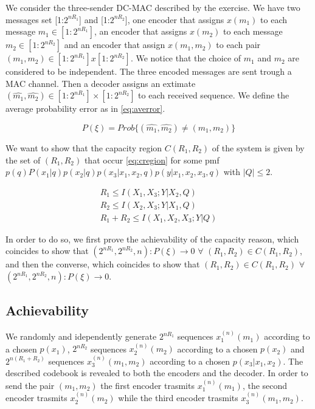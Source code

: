
We consider the three-sender DC-MAC described by the exercise. We have two messages set [1:$2^{nR_1}$] and [1:$2^{nR_2}$], one encoder that assigns $x(m_1)$ to each message $m_1 \in [1:2^{nR_1}]$, an encoder that assigns $x(m_2)$ to each message $m_2 \in [1:2^{nR_2}]$ and an encoder that assign $x(m_1,m_2)$ to each pair $(m_1,m_2) \in [1:2^{nR_1}]x[1:2^{nR_2}]$. We notice that the choice of $m_1$ and $m_2$ are considered to be independent. The three encoded messages are sent trough a MAC channel. Then a decoder assigns an extimate $(\hat{m_1},\hat{m_2}) \in [1:2^{nR_1}] \times [1:2^{nR_2}]$ to each received sequence. We define the average probability error as in \eqref{eq:averror}.

\begin{equation}
	P(\xi)=Prob\{(\hat{m_1},\hat{m_2}) \neq (m_1,m_2)\}
	\label{eq:averror}
\end{equation}

We want to show that the capacity region $C(R_1, R_2)$ of the system is given by the set of $(R_1,R_2)$ that occur \eqref{eq:cregion} for some pmf $p(q)P(x_1|q)p(x_2|q)p(x_3|x_1,x_2,q)p(y|x_1,x_2,x_3,q)$ with $|Q| \leq 2$.

\begin{equation}
	\begin{gathered}
		R_1 \leq I(X_1,X_3;Y|X_2,Q) \\
		R_2 \leq I(X_2,X_3;Y|X_1,Q) \\
		R_1+R_2 \leq I(X_1,X_2,X_3;Y|Q)
	\end{gathered}
	\label{eq:cregion}
\end{equation}

In order to do so, we first prove the achievability of the capacity reason, which coincides to show that $(2^{nR_1},2^{nR_2},n):P(\xi) \rightarrow 0$ $ \forall $ $ (R_1,R_2) \in C(R_1, R_2) $, and then the converse, which coincides to show that $(R_1,R_2) \in C(R_1, R_2) $ $\forall $ $ (2^{nR_1},2^{nR_2},n):P(\xi) \rightarrow 0$.

\subsection{Achievability}

We randomly and idependently generate $2^{nR_1}$ sequences $x_1^{(n)}(m_1)$ according to a chosen $p(x_1)$, $2^{nR_2}$ sequences $x_2^{(n)}(m_2)$ according to a chosen $p(x_2)$ and $2^{n(R_1+R_2)}$ sequences $x_3^{(n)}(m_1,m_2)$ according to a chosen $p(x_3|x_1,x_2)$. The described codebook is revealed to both the encoders and the decoder. In order to send the pair $(m_1,m_2)$ the first encoder trasmits $x_1^{(n)}(m_1)$, the second encoder trasmits $x_2^{(n)}(m_2)$ while the third encoder trasmits $x_3^{(n)}(m_1,m_2)$.

